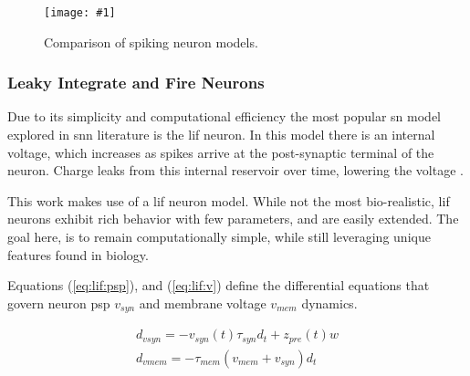 \documentclass[conference]{IEEEtran}
\newcommand{\afigf}[3]{
	\begin{figure}[h]
    	\centering
		\texttt{[image: \#1]}
        \caption{#2.}
        \label{#3}
	\end{figure}
}
\newcommand{\eq}[1]{Equation (\ref{#1})}
\begin{document}
\afigf{figures/JEI_31_1_010901_f004.png}{Comparison of spiking neuron
  models}{fig:sn_model_compare}

\subsubsection{Leaky Integrate and Fire Neurons}
Due to its simplicity and computational efficiency the most popular \gls{sn}
model explored in \gls{snn} literature is the \gls{lif} neuron. In this model
there is an internal voltage, which increases as spikes arrive at the
post-synaptic terminal of the neuron. Charge leaks from this internal reservoir
over time, lowering the voltage \parencite{izhikevich_2004}.






This work makes use of a \gls{lif} neuron model. While not the most
bio-realistic, \gls{lif} neurons exhibit rich behavior with few parameters, and
are easily extended. The goal here, is to remain computationally simple, while
still leveraging unique features found in biology.

Equations (\ref{eq:lif:psp}), and (\ref{eq:lif:v}) define the differential equations that
govern neuron \gls{psp} $v_{syn}$ and membrane voltage $v_{mem}$
dynamics.

\begin{align}
d_{vsyn} = -v_{syn}(t) \tau_{syn} d_t + z_{pre}(t) w \label{eq:lif:psp} \\
d_{vmem} = -\tau_{mem} (v_{mem} + v_{syn}) d_t \label{eq:lif:v}
\end{align}
\end{document}
